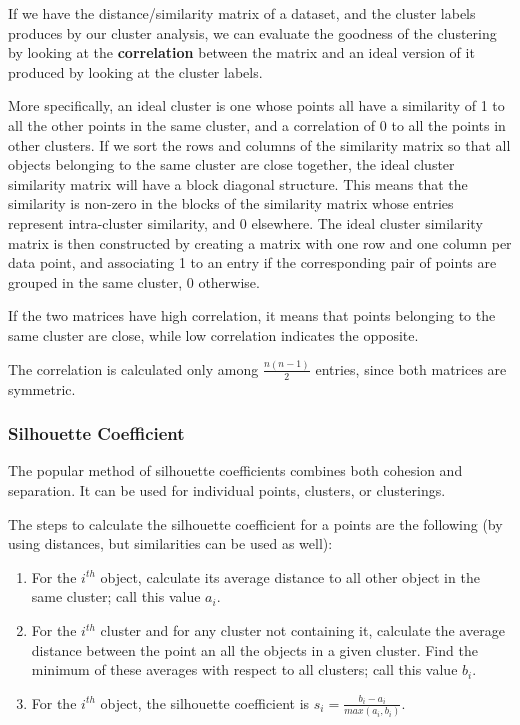 If we have the distance/similarity matrix of a dataset, and the cluster labels produces by our cluster analysis, we can evaluate the goodness of the clustering by looking at the \textbf{correlation} between the matrix and an ideal version of it produced by looking at the cluster labels.

More specifically, an ideal cluster is one whose points all have a similarity of 1 to all the other points in the same cluster, and a correlation of 0 to all the points in other clusters. If we sort the rows and columns of the similarity matrix so that all objects belonging to the same cluster are close together, the ideal cluster similarity matrix will have a block diagonal structure. This means that the similarity is non-zero in the blocks of the similarity matrix whose entries represent intra-cluster similarity, and 0 elsewhere. The ideal cluster similarity matrix is then constructed by creating a matrix with one row and one column per data point, and associating 1 to an entry if the corresponding pair of points are grouped in the same cluster, 0 otherwise.

If the two matrices have high correlation, it means that points belonging to the same cluster are close, while low correlation indicates the opposite.

The correlation is calculated only among $\frac{n(n-1)}{2}$ entries, since both matrices are symmetric.

\subsubsection{Silhouette Coefficient}

The popular method of silhouette coefficients combines both cohesion and separation. It can be used for individual points, clusters, or clusterings.

The steps to calculate the silhouette coefficient for a points are the following (by using distances, but similarities can be used as well):

\begin{enumerate}
    \item For the $i^{th}$ object, calculate its average distance to all other object in the same cluster; call this value $a_i$.

    \item For the $i^{th}$ cluster and for any cluster not containing it, calculate the average distance between the point an all the objects in a given cluster. Find the minimum of these averages with respect to all clusters; call this value $b_i$.

    \item For the $i^{th}$ object, the silhouette coefficient is $s_i = \frac{b_i - a_i}{max(a_i,b_i)}$.
\end{enumerate}

